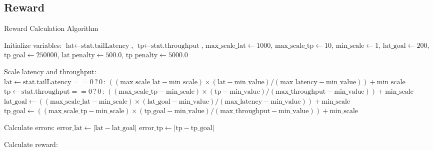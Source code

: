 \subsection{Reward}

\begin{algorithm}[ht]
  \caption{Reward Calculation Algorithm}
  \label{algo:reward_calculation}
  \SetAlgoLined
  
  Initialize variables: $\text{lat} \leftarrow \text{stat.tailLatency}$, $\text{tp} \leftarrow \text{stat.throughput}$, $\text{max\_scale\_lat} \leftarrow 1000$, $\text{max\_scale\_tp} \leftarrow 10$, $\text{min\_scale} \leftarrow 1$, $\text{lat\_goal} \leftarrow 200$, $\text{tp\_goal} \leftarrow 250000$, $\text{lat\_penalty} \leftarrow 500.0$, $\text{tp\_penalty} \leftarrow 5000.0$\;
  
  
  
  Scale latency and throughput:
  $\text{lat} \leftarrow \text{stat.tailLatency} == 0 \, ? \, 0 \, : \, ((\text{max\_scale\_lat} - \text{min\_scale}) \times (\text{lat} - \text{min\_value}) / (\text{max\_latency} - \text{min\_value})) + \text{min\_scale}$\;
  $\text{tp} \leftarrow \text{stat.throughput} == 0 \, ? \, 0 \, : \, ((\text{max\_scale\_tp} - \text{min\_scale}) \times (\text{tp} - \text{min\_value}) / (\text{max\_throughput} - \text{min\_value})) + \text{min\_scale}$\;
  $\text{lat\_goal} \leftarrow ((\text{max\_scale\_lat} - \text{min\_scale}) \times (\text{lat\_goal} - \text{min\_value}) / (\text{max\_latency} - \text{min\_value})) + \text{min\_scale}$\;
  $\text{tp\_goal} \leftarrow ((\text{max\_scale\_tp} - \text{min\_scale}) \times (\text{tp\_goal} - \text{min\_value}) / (\text{max\_throughput} - \text{min\_value})) + \text{min\_scale}$\;
  
  Calculate errors:
  $\text{error\_lat} \leftarrow |\text{lat} - \text{lat\_goal}|$\;
  $\text{error\_tp} \leftarrow |\text{tp} - \text{tp\_goal}|$\;
  
  Calculate reward:
\end{algorithm}

